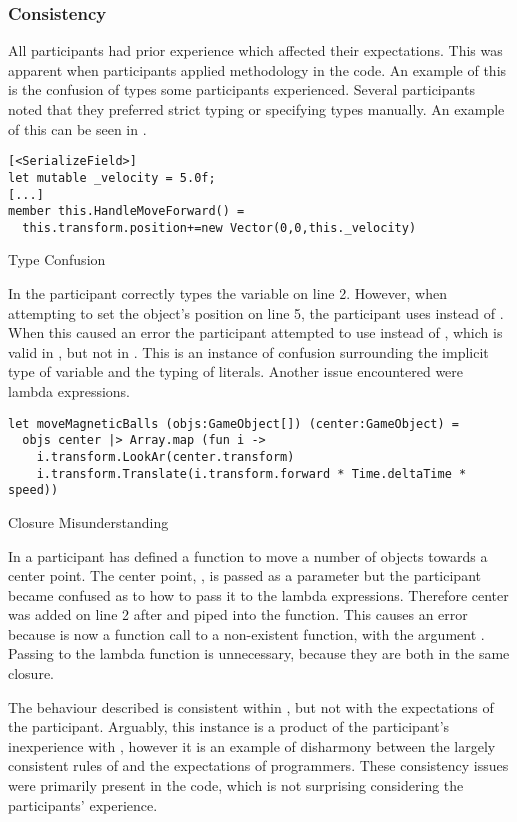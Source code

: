 \subsubsection{Consistency}\label{sec:part-cons} %
All participants had prior \cs experience which affected their expectations. This was apparent when participants applied \cs methodology in the \fs code. An example of this is the confusion of types some participants experienced. Several participants noted that they preferred strict typing or specifying types manually. An example of this can be seen in .

\begin{listing}[H]
\begin{verbatim}
[<SerializeField>]
let mutable _velocity = 5.0f;
[...]
member this.HandleMoveForward() =
  this.transform.position+=new Vector(0,0,this._velocity)
\end{verbatim}
\caption{Type Confusion}
\label{lst:type-conf}
\end{listing}

In  the participant correctly types the  variable on line 2. However, when attempting to set the object's position on line 5, the participant uses  instead of . When this caused an error the participant attempted to use  instead of , which is valid in \cs, but not in \fs. This is an instance of confusion surrounding the implicit type of variable and the typing of literals. Another issue encountered were lambda expressions.

\begin{listing}[H]
\begin{verbatim}
let moveMagneticBalls (objs:GameObject[]) (center:GameObject) =
  objs center |> Array.map (fun i ->
    i.transform.LookAr(center.transform)
    i.transform.Translate(i.transform.forward * Time.deltaTime * speed))
\end{verbatim}
\caption{Closure Misunderstanding}
\label{lst:clos-mis}
\end{listing}

In  a participant has defined a function to move a number of objects towards a center point. The center point, , is passed as a parameter but the participant became confused as to how to pass it to the lambda expressions. Therefore center was added on line 2 after  and piped into the  function. This causes an error because  is now a function call to a non-existent function,  with the argument . Passing  to the lambda function is unnecessary, because they are both in the same closure.

The behaviour described is consistent within \fs, but not with the expectations of the participant. Arguably, this instance is a product of the participant's inexperience with \fs, however it is an example of disharmony between the largely consistent rules of \fs and the expectations of programmers. These consistency issues were primarily present in the \fs code, which is not surprising considering the participants' experience.
